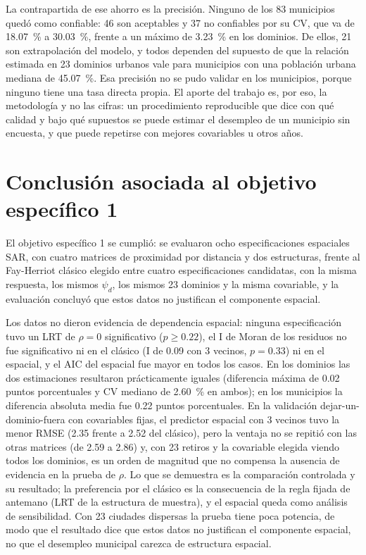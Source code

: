 La contrapartida de ese ahorro es la precisión. Ninguno de los 83 municipios quedó como confiable: 46 son aceptables y 37 no confiables por su CV, que va de 18.07~\% a 30.03~\%, frente a un máximo de 3.23~\% en los dominios. De ellos, 21 son extrapolación del modelo, y todos dependen del supuesto de que la relación estimada en 23 dominios urbanos vale para municipios con una población urbana mediana de 45.07~\%. Esa precisión no se pudo validar en los municipios, porque ninguno tiene una tasa directa propia. El aporte del trabajo es, por eso, la metodología y no las cifras: un procedimiento reproducible que dice con qué calidad y bajo qué supuestos se puede estimar el desempleo de un municipio sin encuesta, y que puede repetirse con mejores covariables u otros años.

\section{Conclusión asociada al objetivo específico 1}

El objetivo específico 1 se cumplió: se evaluaron ocho especificaciones espaciales SAR, con cuatro matrices de proximidad por distancia y dos estructuras, frente al Fay-Herriot clásico elegido entre cuatro especificaciones candidatas, con la misma respuesta, los mismos $\psi_d$, los mismos 23 dominios y la misma covariable, y la evaluación concluyó que estos datos no justifican el componente espacial.

Los datos no dieron evidencia de dependencia espacial: ninguna especificación tuvo un LRT de $\rho = 0$ significativo ($p \geq 0.22$), el I de Moran de los residuos no fue significativo ni en el clásico (I de 0.09 con 3 vecinos, $p = 0.33$) ni en el espacial, y el AIC del espacial fue mayor en todos los casos. En los dominios las dos estimaciones resultaron prácticamente iguales (diferencia máxima de 0.02 puntos porcentuales y CV mediano de 2.60~\% en ambos); en los municipios la diferencia absoluta media fue 0.22 puntos porcentuales. En la validación dejar-un-dominio-fuera con covariables fijas, el predictor espacial con 3 vecinos tuvo la menor RMSE (2.35 frente a 2.52 del clásico), pero la ventaja no se repitió con las otras matrices (de 2.59 a 2.86) y, con 23 retiros y la covariable elegida viendo todos los dominios, es un orden de magnitud que no compensa la ausencia de evidencia en la prueba de $\rho$. Lo que se demuestra es la comparación controlada y su resultado; la preferencia por el clásico es la consecuencia de la regla fijada de antemano (LRT de la estructura de muestra), y el espacial queda como análisis de sensibilidad. Con 23 ciudades dispersas la prueba tiene poca potencia, de modo que el resultado dice que estos datos no justifican el componente espacial, no que el desempleo municipal carezca de estructura espacial.

